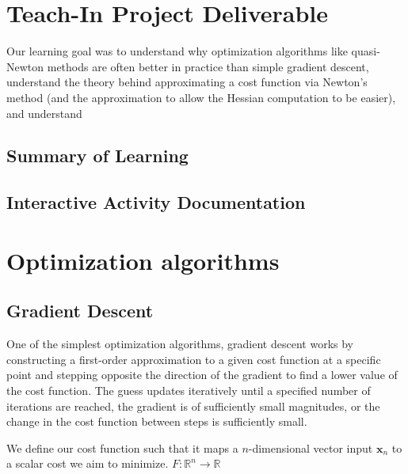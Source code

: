 \documentclass[12pt]{article}
\begin{document}
\section{Teach-In Project Deliverable}

Our learning goal was to understand why optimization algorithms like quasi-Newton methods are often 
better in practice than simple gradient descent, understand the theory behind approximating a cost function
via Newton's method (and the approximation to allow the Hessian computation to be easier), and understand 

\subsection{Summary of Learning}

\subsection{Interactive Activity Documentation}

\section{Optimization algorithms}

\subsection{Gradient Descent}
One of the simplest optimization algorithms, gradient descent works by constructing a first-order
approximation to a given cost function at a specific point and stepping opposite the direction of the 
gradient to find a lower value of the cost function. The guess updates iteratively until a specified number of
iterations are reached, the gradient is of sufficiently small magnitudes, or the change in the cost function
between steps is sufficiently small. 

We define our cost function such that it maps a \(n\)-dimensional vector input \(\mathbf{x}_n\)
to a scalar cost we aim to minimize. \(F : \mathbb{R}^n \to \mathbb{R}\)
\end{document}
